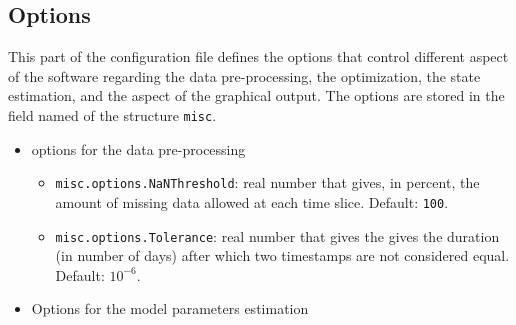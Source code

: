 \subsection{Options}
\label{SS:options}
This part of the configuration file defines the options that control different aspect of the software regarding the data pre-processing, the optimization, the state estimation, and the aspect of the graphical output.
The options are stored in the field named  of the \MATLAB{} structure \lstinline[basicstyle = \mlttfamily \small ]!misc!.
\begin{itemize}

\item options for the data pre-processing

\begin{itemize}
\item \lstinline[basicstyle = \mlttfamily \small ]!misc.options.NaNThreshold!: real number that gives, in percent, the amount of missing data allowed at each time slice. Default: \lstinline[basicstyle = \mlttfamily \small ]!100!.
\item \lstinline[basicstyle = \mlttfamily \small ]!misc.options.Tolerance!: real number that gives the gives the duration (in number of days) after which two timestamps are not considered equal. Default: $10^{-6}$.

\end{itemize}


\item Options for the model parameters estimation


\end{itemize}
